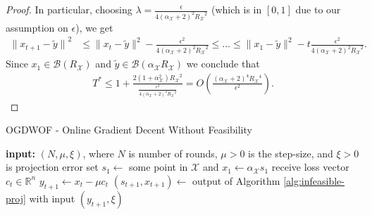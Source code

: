 \documentclass[a4paper,12pt]{article}
\newcommand{\mX}{\mathcal{X}}
\newcommand{\mB}{\mathcal{B}}
\newcommand{\reals}{\mathbb{R}}
\begin{document}
\begin{proof}
In particular,  choosing $\lambda=\frac{\epsilon}{4{(\alpha_\mX +2)}^2 {R_\mX}^2}$ (which is in $[0,1]$ due to our assumption on $\epsilon$), we get
\begin{align*}
{\|x_{t+1}-\tilde{y}\|}^2 &\leq \|x_t-\tilde{y}\|^2 -\frac{\epsilon^2}{4{(\alpha_\mX +2)}^2 {R_\mX}^2} \leq \ldots \leq \|x_1-\tilde{y}\|^2 -t\frac{\epsilon^2}{4{(\alpha_\mX +2)}^2 {R_\mX}^2}.
\end{align*}
Since $x_1\in\mB(R_{\mX})$ and $\tilde{y}\in\mB(\alpha_{\mX}R_{\mX})$ we conclude that
\begin{align*}
T^* \leq  1+ \frac{2{(1+\alpha_{\mX}^2)} {R_{\mX}}^2}{\frac{\epsilon^2}{4{(\alpha_{\mX} +2)}^2 {R_{\mX}}^2}}= O\left({\frac{{(\alpha_{\mX} +2)}^4 {R_{\mX}}^4}{\epsilon^2}}\right).
\end{align*}

\end{proof}


\begin{algorithm}[H]
\caption{OGDWOF - Online Gradient Decent Without Feasibility}
\label{alg:infeasibile OGD}
\begin{algorithmic}[1]
\STATE \textbf{input:} $(N, \mu ,\xi)$, where $N$ is number of rounds, $\mu >0$ is the step-size, and $\xi>0$ is projection error
\STATE set $s_1 \gets $ some point in $\mX$ and $x_1 \gets \alpha_{\mX}s_1$
   \STATE receive loss vector $c_t\in\reals^n$
   \STATE $y_{t+1} \gets x_t -\mu c_t$
   \STATE $(s_{t+1},x_{t+1}) \gets$  output of Algorithm \ref{alg:infeasible-proj} with input $(y_{t+1},\xi)$
   \ENDFOR
\end{algorithmic}
\end{algorithm}
\end{document}
